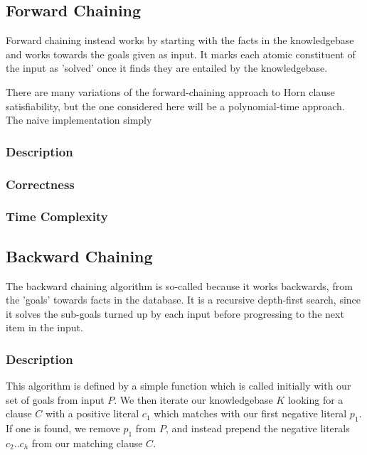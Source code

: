\documentclass{article}
\begin{document}
\subsection{Forward Chaining}

Forward chaining instead works by starting with the facts in the knowledgebase
and works towards the goals given as input. It marks each atomic constituent of
the input as 'solved' once it finds they are entailed by the knowledgebase.

There are many variations of the forward-chaining approach to Horn clause
satisfiability, but the one considered here will be a polynomial-time approach.
The naive implementation simply 

\subsubsection{Description}

\subsubsection{Correctness}

\subsubsection{Time Complexity}

\subsection{Backward Chaining}

The backward chaining algorithm is so-called because it works backwards, from the
'goals' towards facts in the database. It is a recursive depth-first search, since 
it solves the sub-goals turned up by each input before progressing to the next 
item in the input.

\subsubsection{Description}

This algorithm is defined by a simple function which is called initially with
our set of goals from input $P$. We then iterate our knowledgebase $K$ looking for a
clause $C$ with a positive literal $c_1$ which matches with our first negative
literal $p_1$. If one is found, we remove $p_1$ from $P$, and instead prepend
the negative literals $c_2 .. c_h$ from our matching clause $C$.
\end{document}
